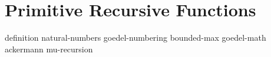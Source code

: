 \chapter{Primitive Recursive
Functions}

{definition}
{natural-numbers}
{goedel-numbering}
{bounded-max}
{goedel-math}
{ackermann}
{mu-recursion}



